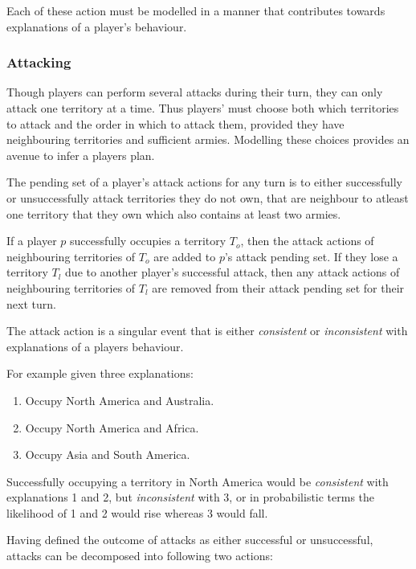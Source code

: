 \documentclass[parskip]{cs4rep}
\begin{document}
Each of these action must be modelled in a manner that contributes towards explanations of a player's behaviour.

\subsubsection{Attacking}

Though players can perform several attacks during their turn, they can only attack one territory at a time. Thus players' must choose both which territories to attack and the order in which to attack them, provided they have neighbouring territories and sufficient armies. Modelling these choices provides an avenue to infer a players plan.

The pending set of a player's attack actions for any turn is to either successfully or unsuccessfully attack territories they do not own, that are neighbour to atleast one territory that they own which also contains at least two armies.

If a player $p$ successfully occupies a territory $T_{o}$, then the attack actions of neighbouring territories of $T_{o}$ are added to $p$'s attack pending set. If they lose a territory $T_{l}$ due to another player's successful attack, then any attack actions of neighbouring territories of $T_{l}$ are removed from their attack pending set for their next turn. 

The attack action is a singular event that is either \textit{consistent} or \textit{inconsistent} with explanations of a players behaviour. 

For example given three explanations:

\begin{enumerate}
\item
Occupy North America and Australia.
\item
Occupy North America and Africa.
\item
Occupy Asia and South America.
\end{enumerate}

Successfully occupying a territory in North America would be \textit{consistent} with explanations 1 and 2, but \textit{inconsistent} with 3, or in probabilistic terms the likelihood of 1 and 2 would rise whereas 3 would fall.

Having defined the outcome of attacks as either successful or unsuccessful, attacks can be decomposed into following two actions: 
\end{document}
